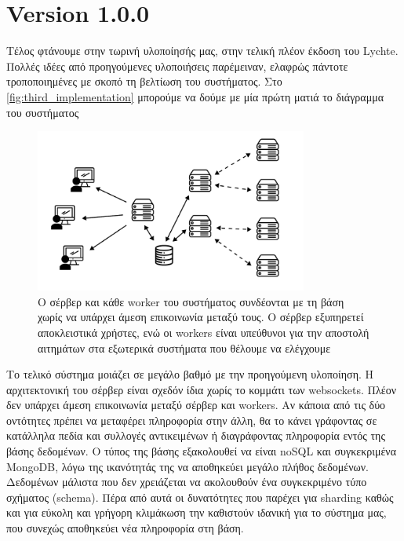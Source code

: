 \section{Version 1.0.0}
\label{section:third_implementation}

Τέλος φτάνουμε στην τωρινή υλοποίησής μας, στην τελική πλέον έκδοση του Lychte. Πολλές ιδέες από προηγούμενες υλοποιήσεις
παρέμειναν, ελαφρώς πάντοτε τροποποιημένες με σκοπό τη βελτίωση του συστήματος. Στο \autoref{fig:third_implementation} μπορούμε να δούμε με μία πρώτη ματιά
το διάγραμμα του συστήματος

\begin{figure}[!ht]
	\centering
	\includegraphics[width=0.8\textwidth]{./images/chapter4/lychte-third-implementation.png}
	\caption[Διάγραμμα Τελικής Υλοποίησης]{Ο σέρβερ και κάθε worker του συστήματος συνδέονται με τη βάση χωρίς να υπάρχει άμεση επικοινωνία μεταξύ τους. Ο σέρβερ εξυπηρετεί αποκλειστικά χρήστες, ενώ οι workers είναι υπεύθυνοι για την αποστολή αιτημάτων στα εξωτερικά συστήματα που θέλουμε να ελέγχουμε}
	\label{fig:third_implementation}
\end{figure}

Το τελικό σύστημα μοιάζει σε μεγάλο βαθμό με την προηγούμενη υλοποίηση. Η αρχιτεκτονική του σέρβερ είναι σχεδόν ίδια χωρίς το κομμάτι των websockets.
Πλέον δεν υπάρχει άμεση επικοινωνία μεταξύ σέρβερ και workers. Αν κάποια από τις δύο οντότητες πρέπει να μεταφέρει
πληροφορία στην άλλη, θα το κάνει γράφοντας σε κατάλληλα πεδία και συλλογές αντικειμένων ή διαγράφοντας πληροφορία εντός της βάσης δεδομένων.
Ο τύπος της βάσης εξακολουθεί να είναι noSQL και συγκεκριμένα MongoDB, λόγω της ικανότητάς της να αποθηκεύει μεγάλο πλήθος δεδομένων. Δεδομένων μάλιστα που δεν χρειάζεται
να ακολουθούν ένα συγκεκριμένο τύπο σχήματος (schema). Πέρα από αυτά οι δυνατότητες που παρέχει για sharding καθώς και για
εύκολη και γρήγορη κλιμάκωση την καθιστούν ιδανική για το σύστημα μας, που συνεχώς αποθηκεύει νέα πληροφορία στη βάση.

